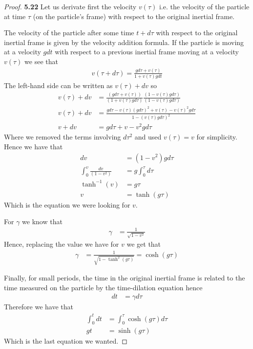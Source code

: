 \documentclass[11pt]{article}
\theoremstyle{definition}
\begin{document}
\begin{proof}{\textbf{5.22}}
    Let us derivate first the velocity $v(\tau)$ i.e. the velocity of the
    particle at time $\tau$ (on the particle's frame) with respect to the
    original inertial frame.

    The velocity of the particle after some time $t + d\tau$
    with respect to the original inertial frame is given by the
    velocity addition formula. If the particle is moving at a velocity
    $gdt$ with respect to a previous inertial frame
    moving at a velocity $v(\tau)$ we see that
    \begin{align*}
        v(\tau + d\tau) = \frac{gd\tau + v(\tau)}{1 + v(\tau)gdt}
    \end{align*}
    The left-hand side can be written as $v(\tau) + dv$ so
    \begin{align*}
        v(\tau) + dv &= \frac{(gd\tau + v(\tau))}{(1 + v(\tau)gd\tau)}
        \frac{(1 - v(\tau)gd\tau)}{(1 - v(\tau)gd\tau)}\\
        v(\tau) + dv &= \frac{gd\tau - v(\tau)(gd\tau)^2 + v(\tau) - v(\tau)^2gd\tau}
        {1 - (v(\tau)gd\tau)^2}\\
        v + dv &= gd\tau + v - v^2gd\tau
    \end{align*}
    Where we removed the terms involving $d\tau^2$ and used $v(\tau) = v$ for
    simplicity. Hence we have that
    \begin{align*}
        dv &= (1 - v^2)gd\tau\\
        \int_0^v\frac{dv}{(1 - v^2)} &= g\int_0^\tau d\tau\\
        \tanh^{-1}(v) &= g\tau\\
        v &= \tanh(g\tau)
    \end{align*}
    Which is the equation we were looking for $v$.

    For $\gamma$ we know that
    \begin{align*}
        \gamma &= \frac{1}{\sqrt{1 - v^2}}
    \end{align*}
    Hence, replacing the value we have for $v$ we get that
    \begin{align*}
        \gamma &= \frac{1}{\sqrt{1 - \tanh^2(g\tau)}} = \cosh(g\tau)
    \end{align*}

    Finally, for small periods, the time in the original inertial frame
    is related to the time measured on the particle by the time-dilation
    equation hence 
    \begin{align*}
        dt &= \gamma d\tau
    \end{align*}
    Therefore we have that
    \begin{align*}
        \int_0^t dt &= \int_0^\tau\cosh(g\tau) d\tau\\
        gt &= \sinh(g\tau)
    \end{align*}
    Which is the last equation we wanted.
\end{proof}
\end{document}

